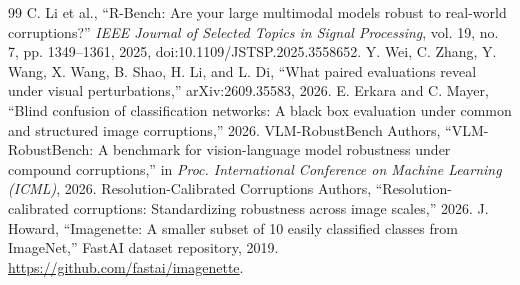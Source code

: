 \documentclass[10pt,twocolumn]{article}
\begin{document}
\begin{thebibliography}{99}
 C. Li et al., ``R-Bench: Are your large multimodal models robust to real-world corruptions?'' \emph{IEEE Journal of Selected Topics in Signal Processing}, vol. 19, no. 7, pp. 1349--1361, 2025, doi:10.1109/JSTSP.2025.3558652.
 Y. Wei, C. Zhang, Y. Wang, X. Wang, B. Shao, H. Li, and L. Di, ``What paired evaluations reveal under visual perturbations,'' arXiv:2609.35583, 2026.
 E. Erkara and C. Mayer, ``Blind confusion of classification networks: A black box evaluation under common and structured image corruptions,'' 2026.
 VLM-RobustBench Authors, ``VLM-RobustBench: A benchmark for vision-language model robustness under compound corruptions,'' in \emph{Proc. International Conference on Machine Learning (ICML)}, 2026.
 Resolution-Calibrated Corruptions Authors, ``Resolution-calibrated corruptions: Standardizing robustness across image scales,'' 2026.
 J. Howard, ``Imagenette: A smaller subset of 10 easily classified classes from ImageNet,'' FastAI dataset repository, 2019. \url{https://github.com/fastai/imagenette}.
\end{thebibliography}
\end{document}
